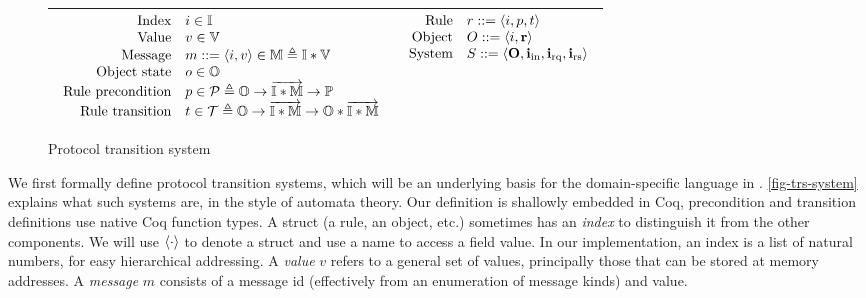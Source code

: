 \begin{figure}[h]
  \centering\small
  \begin{tabular}{|c|c|}
    \hline
    \begin{math}
      \begin{array}{rl}
        \textrm{Index} & i \in \mathbb{I}{} \\
        \textrm{Value} & v \in \mathbb{V}{} \\
        \textrm{Message} & m ::= \langle i, v \rangle \in \mathbb{M}{} \triangleq \mathbb{I} \ast \mathbb{V} \\
        \textrm{Object state} & o \in \mathbb{O}{} \\
        \textrm{Rule precondition} & p \in
        \mathcal{P} \triangleq \mathbb{O} \to \overrightarrow{\mathbb{I} \ast \mathbb{M}} \to \mathbb{P} \\
        \textrm{Rule transition} & t \in
        \mathcal{T} \triangleq \mathbb{O} \to \overrightarrow{\mathbb{I} \ast \mathbb{M}} \to \mathbb{O} \ast \overrightarrow{\mathbb{I} \ast \mathbb{M}} \\
      \end{array}
    \end{math} &
    \begin{math}
      \begin{array}{rl}
        \textrm{Rule} & r ::= \langle i, p, t \rangle \\
        \textrm{Object} & O ::= \langle i, \mathbf{r} \rangle \\
        \textrm{System} & S ::= \langle \mathbf{O}, \mathbf{i_{\textrm{in}}}, \mathbf{i_{\textrm{rq}}}, \mathbf{i_{\textrm{rs}}} \rangle \\
      \end{array}
    \end{math}\\
    \hline
  \end{tabular}
  \caption{Protocol transition system}
  \label{fig-trs-system}
\end{figure}

We first formally define protocol transition systems, which will be an underlying basis for the domain-specific language in \hemiola{}.
\autoref{fig-trs-system} explains what such systems are, in the style of automata theory.
Our definition is shallowly embedded in Coq, \eg{} precondition and transition definitions use native Coq function types.
A struct (a rule, an object, etc.)  sometimes has an \emph{index} to distinguish it from the other components.
We will use $\langle \cdot \rangle$ to denote a struct and use a name to access a field value.
In our implementation, an index is a list of natural numbers, for easy hierarchical addressing.
A \emph{value} $v$ refers to a general set of values, principally those that can be stored at memory addresses.
A \emph{message} $m$ consists of a message id (effectively from an enumeration of message kinds) and value.

